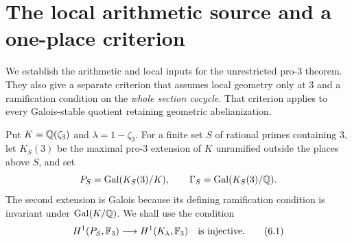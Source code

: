 \section{The local arithmetic source and a one-place criterion}

We establish the arithmetic and local inputs for the unrestricted
pro-$3$ theorem. They also give a separate criterion that assumes
local geometry only at $3$ and a ramification condition on the
\emph{whole section cocycle}. That criterion applies to every
Galois-stable quotient retaining geometric abelianization.

Put $K=\mathbb Q(\zeta_3)$ and $\lambda=1-\zeta_3$. For a finite set $S$ of
rational primes containing $3$, let $K_S(3)$ be the maximal pro-$3$
extension of $K$ unramified outside the places above $S$, and set
\[
 P_S=\operatorname{Gal}(K_S(3)/K),\qquad
 \Gamma_S=\operatorname{Gal}(K_S(3)/\mathbb Q).
\]
The second extension is Galois because its defining ramification
condition is invariant under $\operatorname{Gal}(K/\mathbb Q)$. We shall use the condition
\[
 H^1(P_S,\mathbb F_3)\longrightarrow H^1(K_\lambda,\mathbb F_3)
 \quad\hbox{is injective}.
 \tag{6.1}\label{eq:sourcecriterion}
\]

